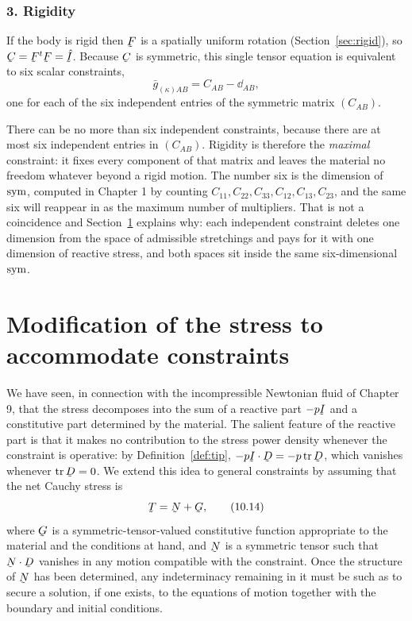 \subsubsection*{3. Rigidity}

If the body is rigid then $\bF$ is a spatially uniform rotation
(Section~\ref{sec:rigid}), so $\bC=\bF^{t}\bF=\hI$. Because $\bC$ is
symmetric, this single tensor equation is equivalent to six scalar
constraints,
\begin{equation}
   \bar g_{(\kappa)AB}=C_{AB}-\dd_{AB},
   \tag{10.13}\label{eq:10.13}
\end{equation}
one for each of the six independent entries of the symmetric matrix
$(C_{AB})$.

\begin{remark}\label{rem:ch10sixmax}
There can be no more than six independent constraints, because there are
at most six independent entries in $(C_{AB})$. Rigidity is therefore the
\emph{maximal} constraint: it fixes every component of that matrix and
leaves the material no freedom whatever beyond a rigid motion. The number
six is the dimension of $\operatorname{sym}$, computed in Chapter 1 by counting
$C_{11},C_{22},C_{33},C_{12},C_{13},C_{23}$, and the same six will
reappear in  as the maximum number of multipliers. That is not
a coincidence and Section~\ref{sec:ch10stress} explains why: each
independent constraint deletes one dimension from the space of admissible
stretchings and pays for it with one dimension of reactive stress, and
both spaces sit inside the same six-dimensional $\operatorname{sym}$.
\end{remark}

\section{Modification of the stress to accommodate
constraints}\label{sec:ch10stress}

We have seen, in connection with the incompressible Newtonian fluid of
Chapter 9, that the stress decomposes into the sum of a reactive part
$-p\I$ and a constitutive part determined by the material. The salient
feature of the reactive part is that it makes no contribution to the
stress power density whenever the constraint is operative: by
Definition~\ref{def:tip}, $-p\I\cdot\bD=-p\tr\bD$, which vanishes
whenever $\tr\bD=0$. We extend this idea to general constraints by
assuming that the net Cauchy stress is
\begin{equation}
   \bT=\bN+\bG ,
   \tag{10.14}\label{eq:10.14}
\end{equation}
where $\bG$ is a symmetric-tensor-valued constitutive function
appropriate to the material and the conditions at hand, and $\bN$ is a
symmetric tensor such that $\bN\cdot\bD$ vanishes in any motion
compatible with the constraint. Once the structure of $\bN$ has been
determined, any indeterminacy remaining in it must be such as to secure a
solution, if one exists, to the equations of motion together with the
boundary and initial conditions.

